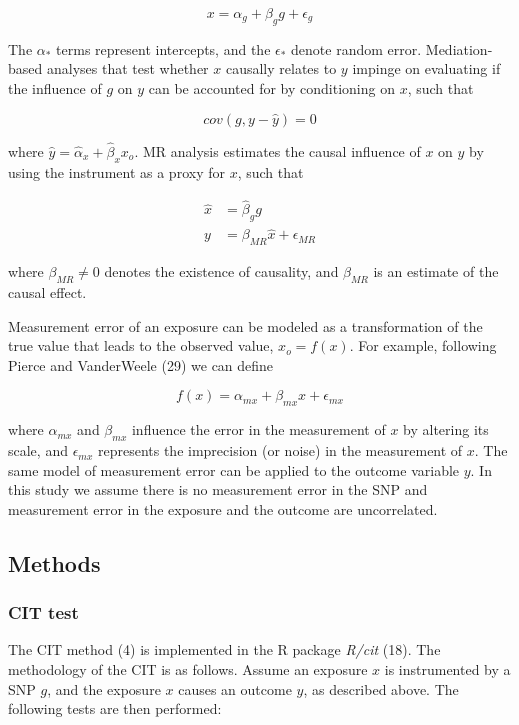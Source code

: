 \documentclass[]{article}
\begin{document}
\[
x = \alpha_g + \beta_g g + \epsilon_g
\]

The \(\alpha_*\) terms represent intercepts, and the \(\epsilon_*\)
denote random error. Mediation-based analyses that test whether \(x\)
causally relates to \(y\) impinge on evaluating if the influence of
\(g\) on \(y\) can be accounted for by conditioning on \(x\), such that

\[
cov(g, y - \hat{y}) = 0
\]

where \(\hat{y} = \hat{\alpha}_x + \hat{\beta}_x x_o\). MR analysis
estimates the causal influence of \(x\) on \(y\) by using the instrument
as a proxy for \(x\), such that

\[
\begin{aligned}
\hat{x} & = \hat{\beta}_g g \\
y & = \beta_{MR}\hat{x} + \epsilon_{MR}
\end{aligned}
\]

where \(\beta_{MR} \neq 0\) denotes the existence of causality, and
\(\beta_{MR}\) is an estimate of the causal effect.

Measurement error of an exposure can be modeled as a transformation of
the true value that leads to the observed value, \(x_o = f(x)\). For
example, following Pierce and VanderWeele (29) we can define

\[
f(x) = \alpha_{mx} + \beta_{mx} x + \epsilon_{mx}
\]

where \(\alpha_{mx}\) and \(\beta_{mx}\) influence the error in the
measurement of \(x\) by altering its scale, and \(\epsilon_{mx}\)
represents the imprecision (or noise) in the measurement of \(x\). The
same model of measurement error can be applied to the outcome variable
\(y\). In this study we assume there is no measurement error in the SNP
and measurement error in the exposure and the outcome are uncorrelated.

\subsection{Methods}\label{methods}

\subsubsection{CIT test}\label{cit-test}

The CIT method (4) is implemented in the R package \emph{R/cit} (18).
The methodology of the CIT is as follows. Assume an exposure \(x\) is
instrumented by a SNP \(g\), and the exposure \(x\) causes an outcome
\(y\), as described above. The following tests are then performed:
\end{document}
